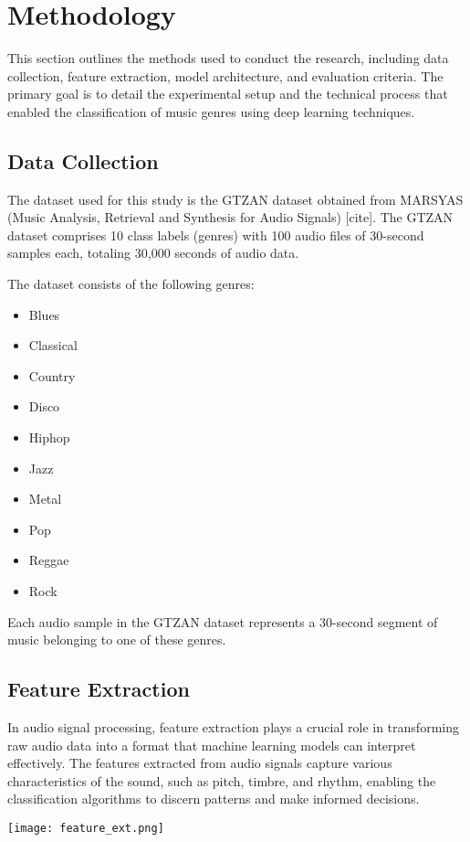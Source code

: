 \documentclass[lettersize,journal]{IEEEtran}
\begin{document}
\section{Methodology}
This section outlines the methods used to conduct the research, including data collection, feature extraction, model architecture, and evaluation criteria. The primary goal is to detail the experimental setup and the technical process that enabled the classification of music genres using deep learning techniques.

\subsection{Data Collection}
The dataset used for this study is the GTZAN dataset obtained from MARSYAS (Music Analysis, Retrieval and Synthesis for Audio Signals) [cite]. The GTZAN dataset comprises 10 class labels (genres) with 100 audio files of 30-second samples each, totaling 30,000 seconds of audio data.

The dataset consists of the following genres:
\begin{itemize}
    \item Blues
    \item Classical
    \item Country
    \item Disco
    \item Hiphop
    \item Jazz
    \item Metal
    \item Pop
    \item Reggae
    \item Rock
\end{itemize}

Each audio sample in the GTZAN dataset represents a 30-second segment of music belonging to one of these genres.


\subsection{Feature Extraction}
In audio signal processing, feature extraction plays a crucial role in transforming raw audio data into a format that machine learning models can interpret effectively. The features extracted from audio signals capture various characteristics of the sound, such as pitch, timbre, and rhythm, enabling the classification algorithms to discern patterns and make informed decisions.
    \begin{center}
    \texttt{[image: feature\_ext.png]}
    \end{center}
\end{document}
